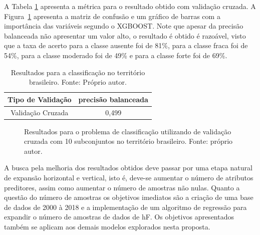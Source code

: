 A Tabela \ref{tab:results_all_class} apresenta a métrica para o resultado obtido com validação cruzada. A Figura\ \ref{fig:classallmik} apresenta a matriz de confusão e um gráfico de barras com a importância das variáveis segundo o XGBOOST. Note que apesar da precisão balanceada não apresentar um valor alto, o resultado é obtido é razoável, visto que a taxa de acerto para a classe ausente foi de 81\%, para a classe fraca foi de 54\%, para a classe moderado foi de 49\% e para a classe forte foi de 69\%.

\begin{table}[H]
\begin{center}
\begin{tabular}{|c|c|}
\hline
Tipo de Validação & precisão balanceada   \\ \hline
Validação Cruzada                   & 0,499   \\ \hline
\end{tabular}
\end{center}
\vspace{12pt}
\caption{Resultados para a classificação no território brasileiro. Fonte: Próprio autor.}
\label{tab:results_all_class}
\end{table}

\begin{figure}[H]
\center
\hspace{-2cm}
\caption{Resultados para o problema de classificação utilizando de validação cruzada com 10 subconjuntos no território brasileiro. Fonte: próprio autor.}
\label{fig:classallmik}
\end{figure}

A busca pela melhoria dos resultados obtidos deve passar por uma etapa natural de expansão horizontal e vertical, isto é, deve-se aumentar o número de atributos preditores, assim como aumentar o número de amostras não nulas. Quanto a questão do número de amostras os objetivos imediatos são a criação de uma base de dados de 2000 à 2018 e a implementação de um algoritmo de regressão para expandir o número de amostras de dados de hF. Os objetivos apresentados também se aplicam aos demais modelos explorados nesta proposta.
